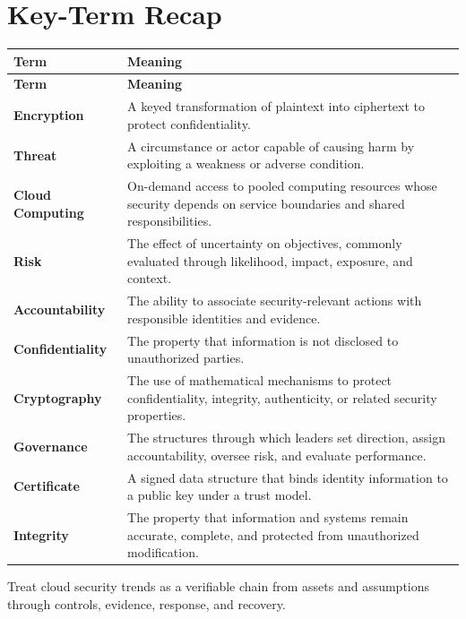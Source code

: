 \documentclass[11pt]{article}
\begin{document}
\section*{Key-Term Recap}
\begin{longtable}{>{\RaggedRight\arraybackslash}p{}>{\RaggedRight\arraybackslash}p{}}
\toprule\rowcolor{Navy}\color{white}\textbf{Term} & \color{white}\textbf{Meaning}\\\midrule
\endfirsthead
\toprule\rowcolor{Navy}\color{white}\textbf{Term} & \color{white}\textbf{Meaning}\\\midrule
\endhead
\textbf{Encryption} & A keyed transformation of plaintext into ciphertext to protect confidentiality. \\\midrule
\textbf{Threat} & A circumstance or actor capable of causing harm by exploiting a weakness or adverse condition. \\\midrule
\textbf{Cloud Computing} & On-demand access to pooled computing resources whose security depends on service boundaries and shared responsibilities. \\\midrule
\textbf{Risk} & The effect of uncertainty on objectives, commonly evaluated through likelihood, impact, exposure, and context. \\\midrule
\textbf{Accountability} & The ability to associate security-relevant actions with responsible identities and evidence. \\\midrule
\textbf{Confidentiality} & The property that information is not disclosed to unauthorized parties. \\\midrule
\textbf{Cryptography} & The use of mathematical mechanisms to protect confidentiality, integrity, authenticity, or related security properties. \\\midrule
\textbf{Governance} & The structures through which leaders set direction, assign accountability, oversee risk, and evaluate performance. \\\midrule
\textbf{Certificate} & A signed data structure that binds identity information to a public key under a trust model. \\\midrule
\textbf{Integrity} & The property that information and systems remain accurate, complete, and protected from unauthorized modification. \\\midrule
\bottomrule
\end{longtable}
\begin{takeawaybox}
Treat cloud security trends as a verifiable chain from assets and assumptions through controls, evidence, response, and recovery.
\end{takeawaybox}
\end{document}
